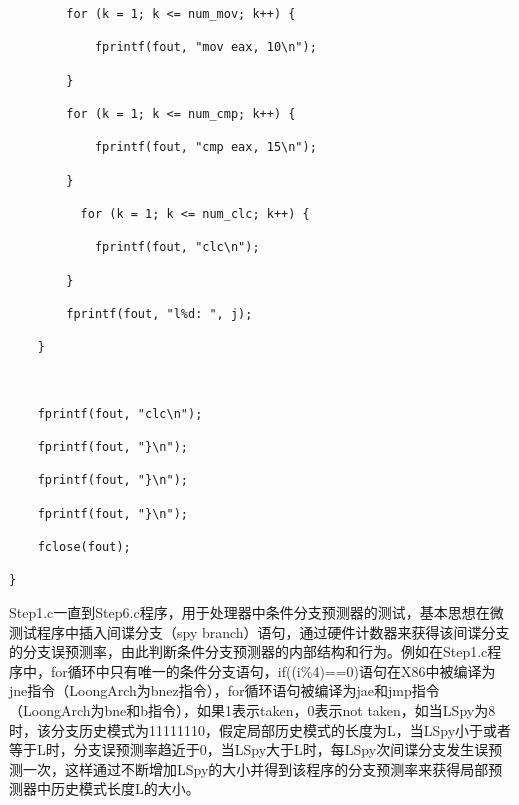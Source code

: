 \documentclass[]{ctexbook}
\begin{document}
\begin{verbatim}
        for (k = 1; k <= num_mov; k++) {

            fprintf(fout, "mov eax, 10\n");

        }

        for (k = 1; k <= num_cmp; k++) {

            fprintf(fout, "cmp eax, 15\n");

        }

          for (k = 1; k <= num_clc; k++) {

            fprintf(fout, "clc\n");

        }

        fprintf(fout, "l%d: ", j);

    }



    fprintf(fout, "clc\n");

    fprintf(fout, "}\n");

    fprintf(fout, "}\n");

    fprintf(fout, "}\n");

    fclose(fout);

}
\end{verbatim}

Step1.c一直到Step6.c程序，用于处理器中条件分支预测器的测试，基本思想在微测试程序中插入间谍分支（spy branch）语句，通过硬件计数器来获得该间谍分支的分支误预测率，由此判断条件分支预测器的内部结构和行为。例如在Step1.c程序中，for循环中只有唯一的条件分支语句，if((i\%4)==0)语句在X86中被编译为jne指令（LoongArch为bnez指令），for循环语句被编译为jae和jmp指令（LoongArch为bne和b指令），如果1表示taken，0表示not taken，如当LSpy为8时，该分支历史模式为11111110，假定局部历史模式的长度为L，当LSpy小于或者等于L时，分支误预测率趋近于0，当LSpy大于L时，每LSpy次间谍分支发生误预测一次，这样通过不断增加LSpy的大小并得到该程序的分支预测率来获得局部预测器中历史模式长度L的大小。
\end{document}
